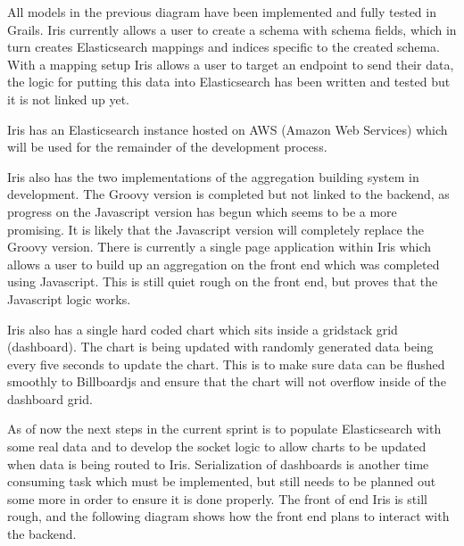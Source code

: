 \documentclass[12pt,a4paper,titlepage]{report}
\begin{document}
All models in the previous diagram have been implemented and fully tested in Grails. Iris currently allows a user to create a schema with schema fields, which in turn creates Elasticsearch mappings and indices specific to the created schema. With a mapping setup Iris allows a user to target an endpoint to send their data, the logic for putting this data into Elasticsearch has been written and tested but it is not linked up yet.

Iris has an Elasticsearch instance hosted on AWS (Amazon Web Services) which will be used for the remainder of the development process.

Iris also has the two implementations of the aggregation building system in development. The Groovy version is completed but not linked to the backend, as progress on the Javascript version has begun which seems to be a more promising. It is likely that the Javascript version will completely replace the Groovy version. There is currently a single page application within Iris which allows a user to build up an aggregation on the front end which was completed using Javascript. This is still quiet rough on the front end, but proves that the Javascript logic works.

Iris also has a single hard coded chart which sits inside a gridstack grid (dashboard). The chart is being updated with randomly generated data being every five seconds to update the chart. This is to make sure data can be flushed smoothly to Billboardjs and ensure that the chart will not overflow inside of the dashboard grid.

As of now the next steps in the current sprint is to populate Elasticsearch with some real data and to develop the socket logic to allow charts to be updated when data is being routed to Iris. Serialization of dashboards is another time consuming task which must be implemented, but still needs to be planned out some more in order to ensure it is done properly. The front of end Iris is still rough, and the following diagram shows how the front end plans to interact with the backend.
\end{document}
